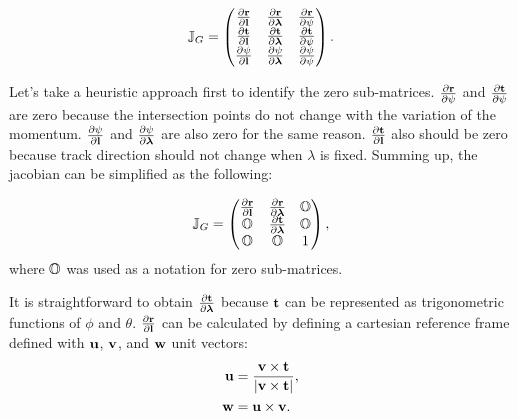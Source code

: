 \documentclass[12pt,a4paper]{scrarticle}
\begin{document}
\begin{equation}\label{eq:jacobi}
    \mathbb{J}_{G} = 
    \begin{pmatrix}
     \frac{\partial{\mathbf{r}}}{\partial{\mathbf{l}}} & \frac{\partial{\mathbf{r}}}{\partial{\boldsymbol{\lambda}}} & \frac{\partial{\mathbf{r}}}{\partial{\psi}} \\
     \frac{\partial{\mathbf{t}}}{\partial{\mathbf{l}}} & \frac{\partial{\mathbf{t}}}{\partial{\boldsymbol{\lambda}}} & \frac{\partial{\mathbf{t}}}{\partial{\psi}} \\
    \frac{\partial{\psi}}{\partial{\mathbf{l}}} & \frac{\partial{\psi}}{\partial{\boldsymbol{\lambda}}} & \frac{\partial{\psi}}{\partial{\psi}}
    \end{pmatrix}.
\end{equation}

Let's take a heuristic approach first to identify the zero sub-matrices. $\frac{\partial{\mathbf{r}}}{\partial{\psi}}$ and $\frac{\partial{\mathbf{t}}}{\partial{\psi}}$ are zero because the intersection points do not change with the variation of the momentum. $\frac{\partial{\psi}}{\partial{\mathbf{l}}}$ and $\frac{\partial{\psi}}{\partial{\boldsymbol{\lambda}}}$ are also zero for the same reason. $\frac{\partial{\mathbf{t}}}{\partial{\mathbf{l}}}$ also should be zero because track direction should not change when $\lambda$ is fixed. Summing up, the jacobian can be simplified as the following:

\begin{equation}\label{eq:jacobi2}
    \mathbb{J}_{G} = 
    \begin{pmatrix}
     \frac{\partial{\mathbf{r}}}{\partial{\mathbf{l}}} & \frac{\partial{\mathbf{r}}}{\partial{\boldsymbol{\lambda}}} &  \mathbb{O} \\
     \mathbb{O} & \frac{\partial{\mathbf{t}}}{\partial{\boldsymbol{\lambda}}} &  \mathbb{O} \\
     \mathbb{O} & \mathbb{O} & 1
    \end{pmatrix},
\end{equation}
where $\mathbb{O}$ was used as a notation for zero sub-matrices.

It is straightforward to obtain $\frac{\partial{\mathbf{t}}}{\partial{\boldsymbol{\lambda}}}$ because $\mathbf{t}$ can be represented as trigonometric functions of $\phi$ and $\theta$. $\frac{\partial{\mathbf{r}}}{\partial{\mathbf{l}}}$ can be calculated by defining a cartesian reference frame defined with $\mathbf{u}$, $\mathbf{v}$, and $\mathbf{w}$ unit vectors:
\begin{align}\label{eq:new_coord}
    \mathbf{u} & = \frac{\mathbf{v} \times \mathbf{t}}{|\mathbf{v} \times \mathbf{t}|}, \nonumber \\
    \mathbf{w} & =  \mathbf{u} \times \mathbf{v}.
\end{align}
\end{document}
